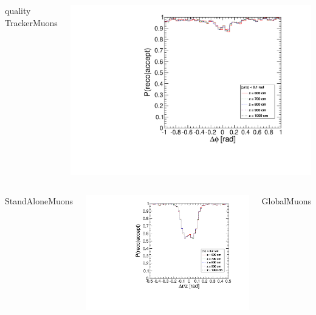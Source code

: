 \documentclass[compress]{beamer}
\begin{document}
\begin{frame}
\begin{columns}
\centering quality TrackerMuons

\includegraphics[width=\linewidth]{endcap_dphi_TrackerMuon.pdf}
\end{columns}

\begin{columns}
\centering StandAloneMuons

\includegraphics[width=\linewidth]{endcap_dr_StandAloneMuon.pdf}

\centering GlobalMuons


\end{columns}
\end{frame}
\end{document}
